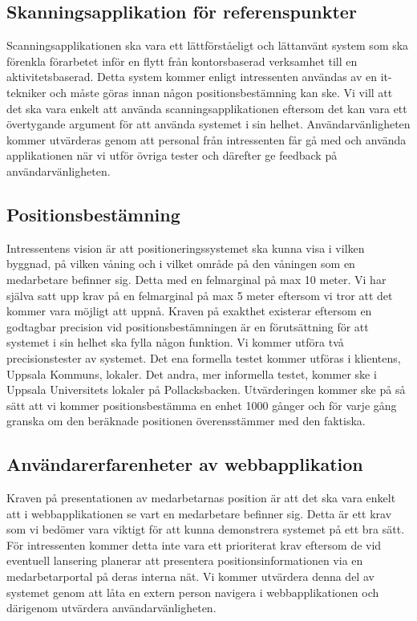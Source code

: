 \documentclass[swedish, a4paper,12pt]{article}
\begin{document}
\subsection{Skanningsapplikation för referenspunkter}
Scanningsapplikationen ska vara ett lättförståeligt och lättanvänt system som ska förenkla förarbetet inför en flytt från kontorsbaserad verksamhet till en aktivitetsbaserad. Detta system kommer enligt intressenten användas av en it-tekniker och måste göras innan någon positionsbestämning kan ske. Vi vill att det ska vara enkelt att använda scanningsapplikationen eftersom det kan vara ett övertygande argument för att använda systemet i sin helhet. Användarvänligheten kommer utvärderas genom att personal från intressenten får gå med och använda applikationen när vi utför övriga tester och därefter ge feedback på användarvänligheten.

\subsection{Positionsbestämning}
Intressentens vision är att positioneringssystemet ska kunna visa i vilken byggnad, på vilken våning och i vilket område på den våningen som en medarbetare befinner sig. Detta med en felmarginal på max 10 meter. Vi har själva satt upp krav på en felmarginal på max 5 meter eftersom vi tror att det kommer vara möjligt att uppnå. Kraven på exakthet existerar eftersom en godtagbar precision vid positionsbestämningen är en förutsättning för att systemet i sin helhet ska fylla någon funktion. Vi kommer utföra två precisionstester av systemet. Det ena formella testet kommer utföras i klientens, Uppsala Kommuns, lokaler. Det andra, mer informella testet, kommer ske i Uppsala Universitets lokaler på Pollacksbacken. Utvärderingen kommer ske på så sätt att vi kommer positionsbestämma en enhet 1000 gånger och för varje gång granska om den beräknade positionen överensstämmer med den faktiska.

\subsection{Användarerfarenheter av webbapplikation}
Kraven på presentationen av medarbetarnas position är att det ska vara enkelt att i webbapplikationen se vart en medarbetare befinner sig. Detta är ett krav som vi bedömer vara viktigt för att kunna demonstrera systemet på ett bra sätt. För intressenten kommer detta inte vara ett prioriterat krav eftersom de vid eventuell lansering planerar att presentera positionsinformationen via en medarbetarportal på deras interna nät. Vi kommer utvärdera denna del av systemet genom att låta en extern person navigera i webbapplikationen och därigenom utvärdera användarvänligheten.
\end{document}
